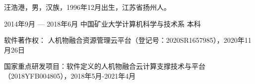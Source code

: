 \documentclass[macfonts,master]{njuthesis}
\begin{document}
\nocite{*}



\backmatter
\begin{resume}
\begin{authorinfo}
\noindent 汪浩港，男，汉族，1996年12月出生，江苏省扬州人。
\end{authorinfo}
\begin{education}
\item[2014年9月 --- 2018年6月] 中国矿业大学计算机科学与技术系 \hfill 本科
\end{education}
\begin{publications}
\item 软件著作权： 人机物融合资源管理云平台（登记号：2020SR1657985），2020年11月26日
\end{publications}

\begin{projects}
	\item 国家重点研发项目：软件定义的人机物融合云计算支撑技术与平台（2018YFB004805），2018年5月-2021年4月
\end{projects}
\end{resume}

\makelicense

\end{document}
